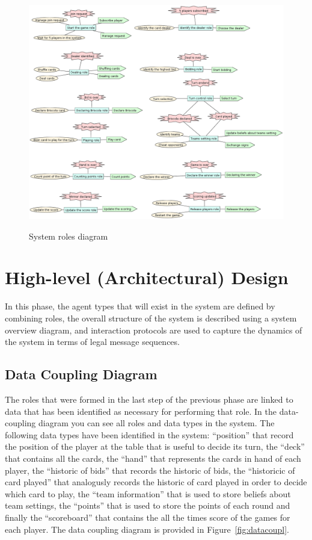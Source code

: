 \documentclass[a4paper]{article}
\begin{document}
\begin{figure}[htp]
  \includegraphics[keepaspectratio,scale=0.4]{pdt/images/system_specification/system_roles.png}
  \label{fig:sysroles}
  \caption{System roles diagram}
\end{figure}

\section{High-level (Architectural) Design}\label{sec:highdesign}

In this phase, the agent types that will exist in the system are defined by combining roles, the overall structure of the system is described using a system overview diagram, and interaction protocols are used to capture the dynamics of the system in terms of legal message sequences.

\subsection{Data Coupling Diagram}

The roles that were formed in the last step of the previous phase are linked to data that has been identified as necessary for performing that role. In the data-coupling diagram you can see all roles and data types in the system. The following data types have been identified in the system: ``position'' that record the position of the player at the table that is useful to decide its turn, the ``deck'' that contains all the cards, the ``hand'' that represents the cards in hand of each player, the ``historic of bids'' that records the historic of bids, the ``historicic of card played'' that analogusly records the historic of card played in order to decide which card to play, the ``team information'' that is used to store beliefs about team settings, the ``points'' that is used to store the points of each round and finally the ``scoreboard'' that contains the all the times score of the games for each player. The data coupling diagram is provided in Figure~\ref{fig:datacoupl}.
\end{document}
